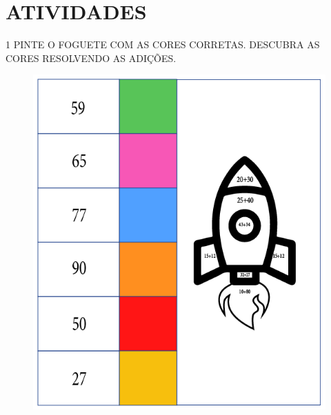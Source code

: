 \section*{ATIVIDADES}

\num{1} PINTE O FOGUETE COM AS CORES CORRETAS. DESCUBRA AS CORES RESOLVENDO AS
ADIÇÕES.


\begin{figure}[htpb!]
\centering
\includegraphics[width=\textwidth]{./media/SAEB_1ANO_MAT_FIGURA19.png}
\end{figure}



